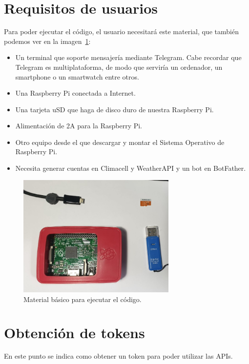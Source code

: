 \section{Requisitos de usuarios}
Para poder ejecutar el código, el usuario necesitará este material, que también podemos ver en la imagen~\ref{material}:
\begin{itemize}
    \item Un terminal que soporte mensajería mediante Telegram. Cabe recordar que Telegram es multiplataforma, de modo que serviría un ordenador, un smartphone o un smartwatch entre otros.
    \item Una Raspberry Pi conectada a Internet.
    \item Una tarjeta uSD que haga de disco duro de nuestra Raspberry Pi.
    \item Alimentación de 2A para la Raspberry Pi.
    \item Otro equipo desde el que descargar y montar el Sistema Operativo de Raspberry Pi.
    \item Necesita generar cuentas en Climacell y WeatherAPI y un bot en BotFather.
\end{itemize}

\begin{figure}[!h]
\centering
\includegraphics[width=0.7\textwidth]{img/fotos/RbP+SD+pen.jpeg}
\caption{Material básico para ejecutar el código.}\label{material}
\end{figure}

\section{Obtención de tokens}
En este punto se indica como obtener un token para poder utilizar las APIs.


